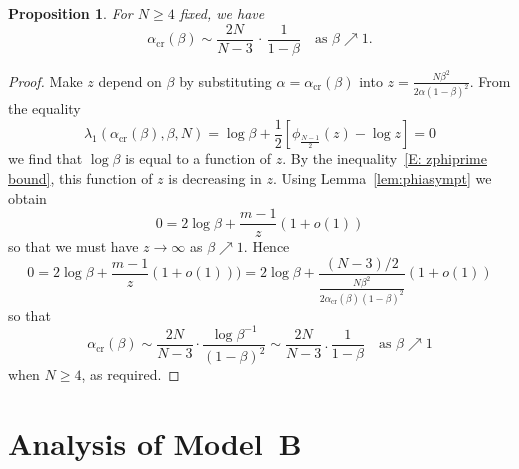 \documentclass[12pt]{article}
\newtheorem{proposition}{Proposition}
\newcommand{\1}{\mathbf{1}}
\begin{document}
\begin{proposition}\label{P: alpha crit near 1}
For $N \ge 4$ fixed, we have
$$ \alpha_{\mathrm{cr}}(\beta) \sim \frac{2N}{N-3} \,\cdot\, \frac{1}{1-\beta} \quad \text{as $\beta \nearrow 1$.}$$
\end{proposition}
\begin{proof}
Make $z$ depend on $\beta$ by substituting $\alpha =\alpha_{\mathrm{cr}}(\beta)$ into $z = \frac{N \beta^2}{2\alpha(1-\beta)^2}$. From the equality 
$$
\lambda_1(\alpha_{\mathrm{cr}}(\beta),\beta,N) = \log \beta + \frac{1}{2}\left[\phi_{\frac{N-1}{2}}(z) - \log z\right]  = 0
$$ 
we find that $\log \beta$ is equal to a function of $z$. By the inequality~\eqref{E: zphiprime bound}, this function of $z$ is decreasing in $z$. Using Lemma~\ref{lem:phiasympt} we obtain
$$
0=2\log\beta+\frac{m-1}{z}(1 +o(1))
$$
so that we must have $z \to \infty$ as $\beta \nearrow 1$. Hence
$$
0=2\log\beta+\frac{m-1}{z}(1 + o(1)))
=2\log\beta+\frac{(N-3)/2}{\frac{N\beta^2}{2\alpha_{\mathrm{cr}}(\beta)(1-\beta)^2}}( 1 + o(1))
$$
so that 
$$
\alpha_\mathrm{cr}(\beta) \sim \frac{2N}{N-3}\cdot \frac{\log \beta^{-1}}{(1-\beta)^2} \sim \frac{2N}{N-3}\,.\,\frac{1}{1-\beta} \quad \text{as $\beta \nearrow 1$}
$$
when $N\ge 4$, as required. \end{proof}




\section{Analysis of Model~B}\label{SecB}
\end{document}
